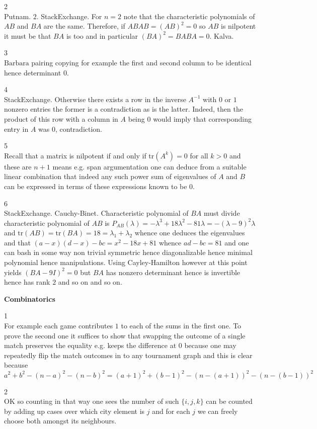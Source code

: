 2 \\
Putnam. $\boxed{2}$. StackExchange. For $n=2$ note that the characteristic polynomials of $AB$ and $BA$ are the same. Therefore, if $ABAB=(AB)^2=0$ so $AB$ is nilpotent it must be that $BA$ is too and in particular $(BA)^2=BABA=0$. Kalva.

3 \\
$\boxed{\text{Barbara}}$ pairing copying for example the first and second column to be identical hence determinant $0$.

4 \\
StackExchange. Otherwise there exists a row in the inverse $A^{-1}$ with $0$ or $1$ nonzero entries the former is a contradiction as is the latter. Indeed, then the product of this row with a column in $A$ being $0$ would imply that corresponding entry in $A$ was $0$, contradiction.

5 \\
Recall that a matrix is nilpotent if and only if $\text{tr}(A^k)=0$ for all $k>0$ and these are $n+1$ means e.g. span argumentation one can deduce from a suitable linear combination that indeed any such power sum of eigenvalues of $A$ and $B$ can be expressed in terms of these expressions known to be $0$.

6 \\
StackExchange. Cauchy-Binet. Characteristic polynomial of $BA$ must divide characteristic polynomial of $AB$ is $P_{AB}(\lambda)=-\lambda^3+18\lambda^2-81\lambda=-(\lambda-9)^2\lambda$ and $\text{tr}(AB)=\text{tr}(BA)=18=\lambda_1+\lambda_2$ whence one deduces the eigenvalues and that $(a-x)(d-x)-bc=x^2-18x+81$ whence $ad-bc=81$ and one can bash in some way non trivial symmetric hence diagonalizable hence minimal polynomial hence manipulations. Using Cayley-Hamilton however at this point yields $(BA-9I)^2=0$ but $BA$ has nonzero determinant hence is invertible hence has rank $2$ and so on and so on.

\newpage

\textbf{Combinatorics}

1 \\
For example each game contributes $1$ to each of the sums in the first one. To prove the second one it suffices to show that swapping the outcome of a single match preserves the equality e.g. keeps the difference at $0$ because one may repeatedly flip the match outcomes in to any tournament graph and this is clear because $a^2+b^2-(n-a)^2-(n-b)^2=(a+1)^2+(b-1)^2-(n-(a+1))^2-(n-(b-1))^2$

2 \\
OK so counting in that way one sees the number of such $\{i,j,k\}$ can be counted by adding up cases over which city element is $j$ and for each $j$ we can freely choose both amongst its neighbours.

